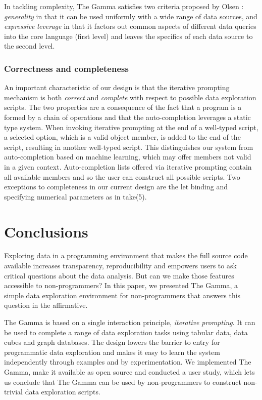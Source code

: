\documentclass[conference]{IEEEtran}
\newcommand{\ikvd}[1]{{\fontfamily{zi4}\selectfont\small #1}}
\begin{document}
In tackling complexity, The Gamma satisfies two criteria proposed by Olsen \cite{evaluating}:
\emph{generality} in that it can be used uniformly with a wide
range of data sources, and \emph{expressive leverage} in that it factors
out common aspects of different data queries into the core language (first level) and leaves the
specifics of each data source to the second level.

\vspace{0.5em}
\subsubsection*{Correctness and completeness}

An important characteristic of our design is that the iterative prompting mechanism is both \emph{correct}
and \emph{complete} with respect to possible data exploration scripts. The two properties are
a consequence of the fact that a program is a formed by a chain of operations and
that the auto-completion leverages a static type system. When invoking iterative prompting
at the end of a well-typed script, a selected option, which is a valid object member, is added to
the end of the script, resulting in another well-typed script. This distinguishes our system from
auto-completion based on machine learning, which may offer members not
valid in a given context. Auto-completion lists offered via iterative prompting contain
all available members and so the user can construct all possible scripts. Two exceptions to
completeness in our current design are the let binding and specifying numerical parameters as in
\ikvd{take(5)}.

\section{Conclusions}

\noindent
Exploring data in a programming environment that makes the full source code available increases
transparency, reproducibility and empowers users to ask critical questions about the data analysis.
But can we make those features accessible to non-programmers? In this paper, we presented The Gamma,
a simple data exploration environment for non-programmers that answers this question in the
affirmative.

The Gamma is based on a single interaction principle, \emph{iterative prompting}. It can be used to
complete a range of data exploration tasks using tabular data, data cubes and graph databases.
The design lowers the barrier to entry for programmatic data exploration and makes it easy to learn
the system independently through examples and by experimentation. We implemented The Gamma, make it
available as open source and conducted a user study, which lets us conclude that
The Gamma can be used by non-programmers to construct non-trivial data exploration scripts.
\end{document}
